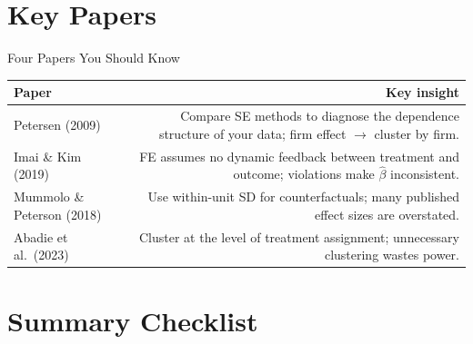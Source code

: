 \documentclass[9pt,aspectratio=169]{beamer}
\begin{document}
\section{Key Papers}

\begin{frame}{Four Papers You Should Know}

\begin{tabular}{@{}lR@{}}
\toprule
\textbf{Paper} & \textbf{Key insight} \\
\midrule
\alert{Petersen (2009)} & Compare SE methods to diagnose the dependence structure of your data; firm effect $\to$ cluster by firm. \\[0.8em]
\alert{Imai \& Kim (2019)} & FE assumes no dynamic feedback between treatment and outcome; violations make $\hat{\beta}$ inconsistent. \\[0.8em]
\alert{Mummolo \& Peterson (2018)} & Use within-unit SD for counterfactuals; many published effect sizes are overstated. \\[0.8em]
\alert{Abadie et al.\ (2023)} & Cluster at the level of treatment assignment; unnecessary clustering wastes power. \\
\bottomrule
\end{tabular}

\end{frame}


\section{Summary Checklist}
\end{document}
